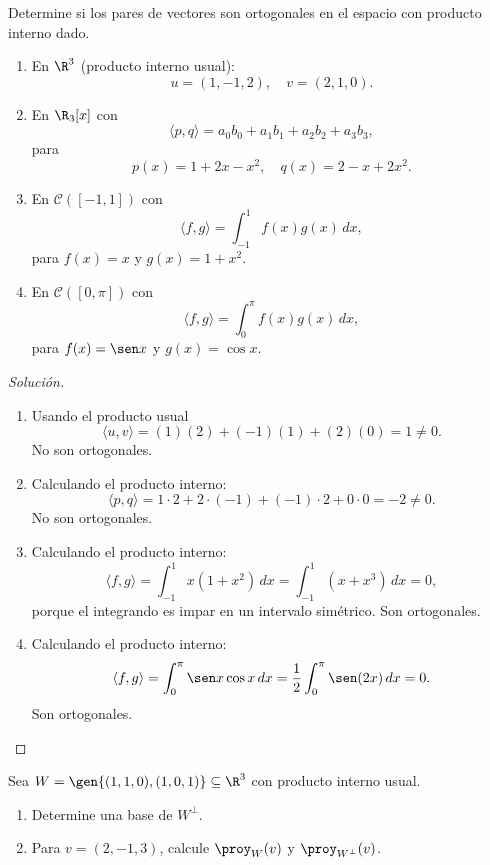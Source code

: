 \documentclass[a4,11pt]{aleph-notas}
\begin{document}
\begin{ejer}
    Determine si los pares de vectores son ortogonales en el espacio con producto interno dado.
    \begin{enumerate}
        \item En $\R^3$ (producto interno usual):
        \[
            u=(1,-1,2),\quad v=(2,1,0).
        \]
        \item En $\R_3[x]$ con
        \[
            \langle p,q\rangle = a_0b_0+a_1b_1+a_2b_2+a_3b_3,
        \]
        para
        \[
            p(x)=1+2x-x^2,\quad q(x)=2-x+2x^2.
        \]
        \item En $\mathcal{C}([-1,1])$ con
        \[
            \langle f,g\rangle = \int_{-1}^1 f(x)g(x)\,dx,
        \]
        para $f(x)=x$ y $g(x)=1+x^2$.
        \item En $\mathcal{C}([0,\pi])$ con
        \[
            \langle f,g\rangle = \int_0^{\pi} f(x)g(x)\,dx,
        \]
        para $f(x)=\sen x$ y $g(x)=\cos x$.
    \end{enumerate}
\end{ejer}

\begin{proof}[Solución]\hspace{0pt}
    \begin{enumerate}
        \item Usando el producto usual
        \[
            \langle u,v\rangle=(1)(2)+(-1)(1)+(2)(0)=1\neq 0.
        \]
        No son ortogonales.
        \item Calculando el producto interno:
        \[
            \langle p,q\rangle = 1\cdot2 + 2\cdot(-1) + (-1)\cdot2 + 0\cdot0 = -2\neq 0.
        \]
        No son ortogonales.
        \item Calculando el producto interno:
        \[
            \langle f,g\rangle=\int_{-1}^1 x(1+x^2)\,dx=\int_{-1}^1(x+x^3)\,dx=0,
        \]
        porque el integrando es impar en un intervalo simétrico. Son ortogonales.
        \item Calculando el producto interno:
        \[
            \langle f,g\rangle=\int_0^{\pi}\sen x\cos x\,dx
            =\frac12\int_0^{\pi}\sen(2x)\,dx
            =0.
        \]
        Son ortogonales.
    \end{enumerate}
\end{proof}

\begin{ejer}
    Sea $W=\gen\{(1,1,0),(1,0,1)\}\subseteq \R^3$ con producto interno usual.
    \begin{enumerate}
        \item Determine una base de $W^\perp$.
        \item Para $v=(2,-1,3)$, calcule $\proy_W(v)$ y $\proy_{W^\perp}(v)$.
    \end{enumerate}
\end{ejer}
\end{document}
